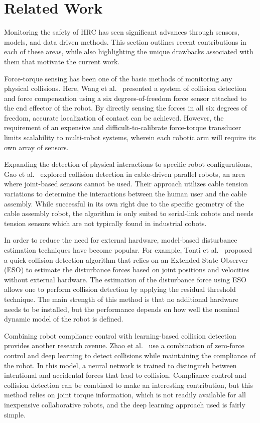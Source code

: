 \documentclass[pdflatex,sn-mathphys-num]{sn-jnl}%
\begin{document}
\section{Related Work}\label{sec:related}

Monitoring the safety of HRC has seen significant advances through sensors, models, and data driven methods. This section outlines recent contributions in each of these areas, while also highlighting the unique drawbacks associated with them that motivate the current work.

Force-torque sensing has been one of the basic methods of monitoring any physical collisions. Here, Wang et al.~\cite{wang2025sixdof} presented a system of collision detection and force compensation using a six degrees-of-freedom force sensor attached to the end effector of the robot. By directly sensing the forces in all six degrees of freedom, accurate localization of contact can be achieved. However, the requirement of an expensive and difficult-to-calibrate force-torque transducer limits scalability to multi-robot systems, wherein each robotic arm will require its own array of sensors.

Expanding the detection of physical interactions to specific robot configurations, Gao et al.~\cite{gao2024cable} explored collision detection in cable-driven parallel robots, an area where joint-based sensors cannot be used. Their approach utilizes cable tension variations to determine the interactions between the human user and the cable assembly. While successful in its own right due to the specific geometry of the cable assembly robot, the algorithm is only suited to serial-link cobots and needs tension sensors which are not typically found in industrial cobots.

In order to reduce the need for external hardware, model-based disturbance estimation techniques have become popular. For example, Tonti et al.~\cite{tonti2024eso} proposed a quick collision detection algorithm that relies on an Extended State Observer (ESO) to estimate the disturbance forces based on joint positions and velocities without external hardware. The estimation of the disturbance force using ESO allows one to perform collision detection by applying the residual threshold technique. The main strength of this method is that no additional hardware needs to be installed, but the performance depends on how well the nominal dynamic model of the robot is defined.

Combining robot compliance control with learning-based collision detection provides another research avenue. Zhao et al.~\cite{zhao2025zeroforce} use a combination of zero-force control and deep learning to detect collisions while maintaining the compliance of the robot. In this model, a neural network is trained to distinguish between intentional and accidental forces that lead to collision. Compliance control and collision detection can be combined to make an interesting contribution, but this method relies on joint torque information, which is not readily available for all inexpensive collaborative robots, and the deep learning approach used is fairly simple.
\end{document}
